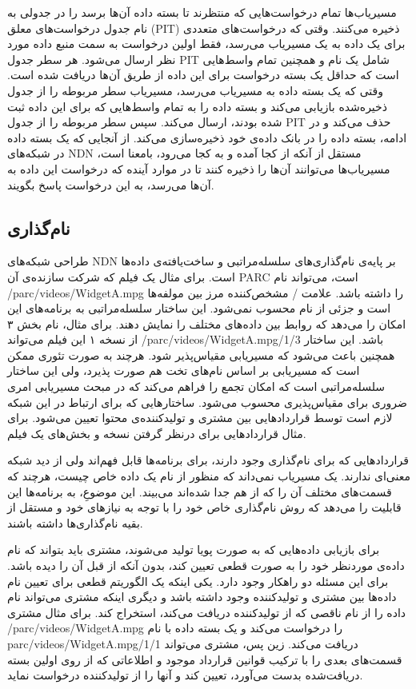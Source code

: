 مسیریاب‌ها تمام درخواست‌‌هایی که منتظرند تا بسته داده آن‌ها برسد را در جدولی به نام جدول درخواست‌های معلق
(PIT)
ذخیره‌ می‌کنند. وقتی که درخواست‌‌‌های متعددی برای یک داده به یک مسیریاب می‌رسد، فقط اولین درخواست به سمت منبع داده مورد نظر ارسال می‌شود. هر سطر جدول PIT شامل یک نام و همچنین تمام واسط‌‌هایی است که حداقل یک بسته درخواست برای این داده از طریق آن‌ها دریافت شده است. وقتی که یک بسته داده به مسیریاب می‌رسد، مسیریاب سطر مربوطه را از جدول ذخیره‌شده بازیابی می‌کند و بسته داده را به تمام واسط‌هایی که برای این داده ثبت شده بودند، ارسال می‌کند. سپس سطر مربوطه را از جدول PIT  حذف می‌کند و در ادامه، بسته داده را در بانک داده‌ی خود ذخیره‌سازی می‌کند. از آنجایی که یک بسته داده در شبکه‌های NDN مستقل از آنکه از کجا آمده و به کجا می‌رود، بامعنا است، مسیریاب‌ها می‌توانند آن‌ها را ذخیره کنند تا در موارد آینده که درخواست این داده به آن‌ها می‌رسد، به این درخواست پاسخ بگویند. 

\subsection{نام‌گذاری}
طراحی شبکه‌های NDN بر پایه‌ی نام‌گذاری‌های سلسله‌مراتبی و ساخت‌یافته‌ی داده‌ها است. برای مثال یک فیلم که شرکت سازنده‌ی آن PARC است، می‌تواند نام /parc/videos/WidgetA.mpg را داشته باشد. علامت / مشخص‌کننده مرز بین مولفه‌ها است و جزئی از نام محسوب نمی‌شود. این ساختار سلسله‌مراتبی به برنامه‌های این امکان را می‌دهد که روابط بین داده‌های مختلف را نمایش دهند. برای مثال، نام بخش ۳ از نسخه ۱ این فیلم می‌تواند /parc/videos/WidgetA.mpg/1/3 باشد. این ساختار همچنین باعث می‌شود که مسیریابی مقیاس‌پذیر شود. هرچند به صورت تئوری ممکن است که مسیریابی بر اساس نام‌های تخت  هم صورت پذیرد،
\cite{rofl}
 ولی این ساختار سلسله‌مراتبی است که امکان تجمع را فراهم می‌کند که در مبحث مسیریابی امری ضروری برای مقیاس‌پذیری محسوب می‌شود. ساختارهایی که برای ارتباط در این شبکه لازم است توسط قرارداد‌هایی بین مشتری و تولیدکننده‌ی محتوا تعیین می‌شود. برای مثال قراردادهایی برای درنظر گرفتن نسخه و بخش‌های یک فیلم.
 
قراردادهایی که برای نام‌گذاری وجود دارند، برای برنامه‌ها قابل فهم‌اند ولی از دید شبکه معنی‌ای ندارند. یک مسیریاب نمی‌داند که منظور از نام یک داده خاص چیست، هرچند که قسمت‌های مختلف آن را که از هم جدا شده‌اند می‌بیند. این موضوعِ، به برنامه‌ها این قابلیت را می‌دهد که روش نام‌گذاری خاص خود را با توجه به نیاز‌های خود و مستقل از بقیه نام‌گذاری‌ها داشته باشند. 

برای بازیابی داده‌هایی که به صورت پویا تولید می‌شوند، مشتری باید بتواند که نام داده‌ی موردنظر خود را به صورت قطعی تعیین کند، بدون آنکه از قبل آن را دیده باشد. برای این مسئله دو راهکار وجود دارد. یکی اینکه یک الگوریتم قطعی برای تعیین نام داده‌ها بین مشتری و تولیدکننده وجود داشته باشد  و دیگری اینکه مشتری می‌تواند نام داده را از نام ناقصی که از تولیدکننده دریافت‌ می‌کند، استخراج کند. برای مثال مشتری /parc/videos/WidgetA.mpg را درخواست می‌کند و یک بسته داده با نام  parc/videos/WidgetA.mpg/1/1 دریافت می‌کند. زین پس، مشتری می‌تواند قسمت‌های بعدی را با ترکیب قوانین قرارداد موجود و اطلاعاتی که از روی اولین بسته دریافت‌شده بدست می‌آورد، تعیین کند و آنها را از تولیدکننده درخواست نماید. 

